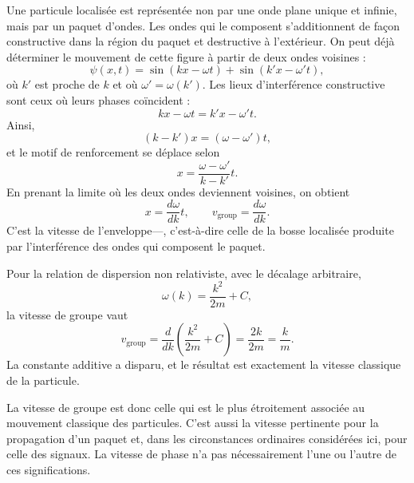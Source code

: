 Une particule localisée est représentée non par une onde plane unique et infinie, mais par un paquet d’ondes. Les ondes qui le composent s’additionnent de façon constructive dans la région du paquet et destructive à l’extérieur. On peut déjà déterminer le mouvement de cette figure à partir de deux ondes voisines :
\begin{equation}
\psi(x,t)=
\sin(kx-\omega t)+
\sin(k'x-\omega't),
\end{equation}
où \(k'\) est proche de \(k\) et où \(\omega'=\omega(k')\). Les lieux d’interférence constructive sont ceux où leurs phases coïncident :
\begin{equation}
kx-\omega t=k'x-\omega't.
\end{equation}
Ainsi,
\begin{equation}
(k-k')x=(\omega-\omega')t,
\end{equation}
et le motif de renforcement se déplace selon
\begin{equation}
x=\frac{\omega-\omega'}{k-k'}t.
\end{equation}
En prenant la limite où les deux ondes deviennent voisines, on obtient
\begin{equation}
x=\frac{d\omega}{dk}t,
\qquad
v_{\mathrm{group}}=\frac{d\omega}{dk}.
\end{equation}
C’est la vitesse de l’enveloppe---, c’est-à-dire celle de la bosse localisée produite par l’interférence des ondes qui composent le paquet.

Pour la relation de dispersion non relativiste, avec le décalage arbitraire,
\begin{equation}
\omega(k)=\frac{k^2}{2m}+C,
\end{equation}
la vitesse de groupe vaut
\begin{equation}
v_{\mathrm{group}}
=\frac{d}{dk}\left(\frac{k^2}{2m}+C\right)
=\frac{2k}{2m}
=\frac{k}{m}.
\end{equation}
La constante additive a disparu, et le résultat est exactement la vitesse classique de la particule.

\begin{classroomqa}
\end{classroomqa}

La vitesse de groupe est donc celle qui est le plus étroitement associée au mouvement classique des particules. C’est aussi la vitesse pertinente pour la propagation d’un paquet et, dans les circonstances ordinaires considérées ici, pour celle des signaux. La vitesse de phase n’a pas nécessairement l’une ou l’autre de ces significations.

